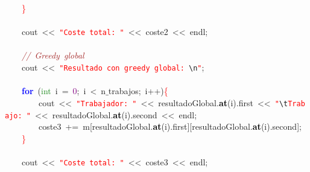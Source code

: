 \mbox{}\ \ \ \ \textcolor{Red}{\}} \\
\mbox{} \\
\mbox{}\ \ \ \ cout\ \textcolor{BrickRed}{\textless{}\textless{}}\ \texttt{\textcolor{Red}{"{}Coste\ total:\ "{}}}\ \textcolor{BrickRed}{\textless{}\textless{}}\ coste2\ \textcolor{BrickRed}{\textless{}\textless{}}\ endl\textcolor{BrickRed}{;} \\
\mbox{} \\
\mbox{}\ \ \ \ \textit{\textcolor{Brown}{//\ Greedy\ global}} \\
\mbox{}\ \ \ \ cout\ \textcolor{BrickRed}{\textless{}\textless{}}\ \texttt{\textcolor{Red}{"{}Resultado\ con\ greedy\ global:\ }}\texttt{\textcolor{CarnationPink}{\textbackslash{}n}}\texttt{\textcolor{Red}{"{}}}\textcolor{BrickRed}{;}\  \\
\mbox{} \\
\mbox{}\ \ \ \ \textbf{\textcolor{Blue}{for}}\ \textcolor{BrickRed}{(}\textcolor{ForestGreen}{int}\ i\ \textcolor{BrickRed}{=}\ \textcolor{Purple}{0}\textcolor{BrickRed}{;}\ i\ \textcolor{BrickRed}{\textless{}}\ n$\_$trabajos\textcolor{BrickRed}{;}\ i\textcolor{BrickRed}{++)}\textcolor{Red}{\{} \\
\mbox{}\ \ \ \ \ \ \ \ cout\ \textcolor{BrickRed}{\textless{}\textless{}}\ \texttt{\textcolor{Red}{"{}Trabajador:\ "{}}}\ \textcolor{BrickRed}{\textless{}\textless{}}\ resultadoGlobal\textcolor{BrickRed}{.}\textbf{\textcolor{Black}{at}}\textcolor{BrickRed}{(}i\textcolor{BrickRed}{).}first\ \textcolor{BrickRed}{\textless{}\textless{}}\ \texttt{\textcolor{Red}{"{}}}\texttt{\textcolor{CarnationPink}{\textbackslash{}t}}\texttt{\textcolor{Red}{Trabajo:\ "{}}}\ \textcolor{BrickRed}{\textless{}\textless{}}\ resultadoGlobal\textcolor{BrickRed}{.}\textbf{\textcolor{Black}{at}}\textcolor{BrickRed}{(}i\textcolor{BrickRed}{).}second\ \textcolor{BrickRed}{\textless{}\textless{}}\ endl\textcolor{BrickRed}{;}\  \\
\mbox{}\ \ \ \ \ \ \ \ coste3\ \textcolor{BrickRed}{+=}\ m\textcolor{BrickRed}{[}resultadoGlobal\textcolor{BrickRed}{.}\textbf{\textcolor{Black}{at}}\textcolor{BrickRed}{(}i\textcolor{BrickRed}{).}first\textcolor{BrickRed}{][}resultadoGlobal\textcolor{BrickRed}{.}\textbf{\textcolor{Black}{at}}\textcolor{BrickRed}{(}i\textcolor{BrickRed}{).}second\textcolor{BrickRed}{];}\  \\
\mbox{}\ \ \ \ \textcolor{Red}{\}} \\
\mbox{}\ \ \ \  \\
\mbox{}\ \ \ \ cout\ \textcolor{BrickRed}{\textless{}\textless{}}\ \texttt{\textcolor{Red}{"{}Coste\ total:\ "{}}}\ \textcolor{BrickRed}{\textless{}\textless{}}\ coste3\ \textcolor{BrickRed}{\textless{}\textless{}}\ endl\textcolor{BrickRed}{;}\ \ \ \ \ \ \ \ \ \ \ \ \  \\
